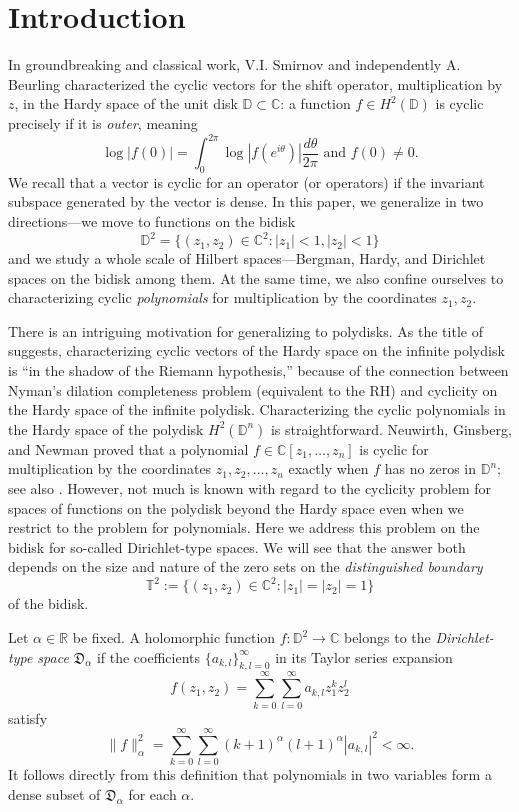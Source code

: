 \documentclass[11 pt,reqno]{amsart}
\theoremstyle{definition}
\theoremstyle{remark}
\numberwithin{equation}{section} \numberwithin{figure}{section}
\begin{document}
\section{Introduction}

In groundbreaking and classical work, V.I. Smirnov \cite{Smirnov} and
independently A. Beurling \cite{Beurling} characterized the cyclic vectors for
the shift operator, multiplication by $z$, in the Hardy space of the
unit disk ${{\mathbb D}} \subset {{\mathbb C}}$: a function $f\in H^2(\mathbb{D})$ is
cyclic precisely if it is \emph{outer}, meaning
\[
\log |f(0)| = \int_0^{2\pi} \log |f(e^{i\theta})| \frac{d\theta}{2\pi}
\text{ and } f(0) \ne 0.
\]
We recall that a vector is cyclic for an operator (or operators) if
the invariant subspace generated by the vector is dense.  In this
paper, we generalize in two directions---we move to functions on the
bidisk
\[\mathbb{D}^2=\{(z_1,z_2)\in \mathbb{C}^2\colon |z_1|<1, |z_2|<1\}\]
and we study a whole scale of Hilbert spaces---Bergman, Hardy, and
Dirichlet spaces on the bidisk among them.  At the same time, we also
confine ourselves to characterizing cyclic \emph{polynomials} for
multiplication by the coordinates $z_1,z_2$.

There is an intriguing motivation for generalizing to polydisks.  As
the title of \cite{Nikolskii} suggests, characterizing cyclic vectors
of the Hardy space on the infinite polydisk is ``in the shadow of the
Riemann hypothesis,'' because of the connection between Nyman's
dilation completeness problem (equivalent to the RH) and cyclicity on the
Hardy space of the infinite polydisk.  Characterizing the cyclic
polynomials in the Hardy space of the polydisk $H^2({{\mathbb D}}^n)$ is
straightforward.  Neuwirth, Ginsberg, and Newman \cite{NGN} proved
that a polynomial $f \in {{\mathbb C}}[z_1,\dots, z_n]$ is cyclic for
multiplication by the coordinates $z_1,z_2,\dots, z_n$ exactly when
$f$ has no zeros in ${{\mathbb D}}^n$; see also \cite{Gel95}.  However, not much
is known with regard to the cyclicity problem for spaces of functions
on the polydisk beyond the Hardy space even when we restrict to the
problem for polynomials.  Here we address this problem on the bidisk
for so-called Dirichlet-type spaces.  We will see that the answer both
depends on the size and nature of the zero sets on the
\emph{distinguished boundary}
\[
{{\mathbb T}}^2:= \{(z_1,z_2) \in {{\mathbb C}}^2: |z_1|=|z_2|=1\}
\]
of the bidisk.

Let $\alpha\in {{\mathbb R}}$ be fixed. A holomorphic function $f\colon \mathbb{D}^2\to \mathbb{C}$
belongs to the {\it Dirichlet-type space} $\mathfrak{D}_{\alpha}$ if the
coefficients $\{a_{k,l}\}_{k,l=0}^{\infty}$ in its Taylor series expansion
\[f(z_1,z_2)=\sum_{k=0}^{\infty}\sum_{l=0}^{\infty}a_{k,l}z_1^kz_2^l\]
satisfy
\begin{equation}
\|f\|^2_{\alpha}=
\sum_{k=0}^{\infty}\sum_{l=0}^{\infty}(k+1)^{\alpha}(l+1)^{\alpha}|a_{k,l}|^2<\infty.
\label{JRnorm}
\end{equation}
It follows directly from this definition that polynomials in two variables form a dense subset of
$\mathfrak{D}_{\alpha}$ for each $\alpha$.
\end{document}
